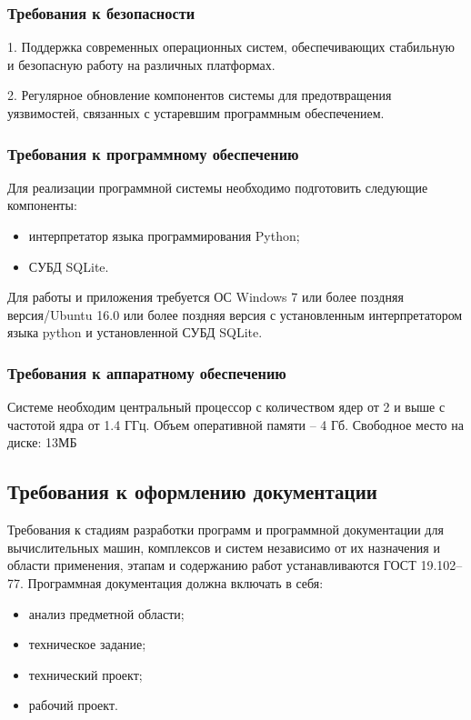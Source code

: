 \subsubsection{Требования к безопасности}
1. Поддержка современных операционных систем, обеспечивающих стабильную и безопасную работу на различных платформах.

2. Регулярное обновление компонентов системы для предотвращения уязвимостей, связанных с устаревшим программным обеспечением.

\subsubsection{Требования к программному обеспечению}

Для реализации программной системы необходимо подготовить следующие компоненты:
\begin{itemize}
	\item интерпретатор языка программирования Python;
	\item СУБД SQLite.
\end{itemize}
Для работы и приложения требуется ОС Windows 7 или более поздняя версия/Ubuntu 16.0 или более поздняя версия с установленным интерпретатором языка python и установленной СУБД SQLite.

\subsubsection{Требования к аппаратному обеспечению}
Системе необходим центральный процессор с количеством ядер от 2 и выше с частотой ядра от 1.4 ГГц. Объем оперативной памяти – 4 Гб.
Свободное место на диске: 13МБ

\subsection{Требования к оформлению документации}

Требования к стадиям разработки программ и программной документации для вычислительных машин, комплексов и систем независимо от их
назначения и области применения, этапам и содержанию работ устанавливаются ГОСТ 19.102–77. Программная документация должна включать в себя:
\begin{itemize}
	\item анализ предметной области;
	\item техническое задание;
	\item технический проект;
	\item рабочий проект.
\end{itemize}
